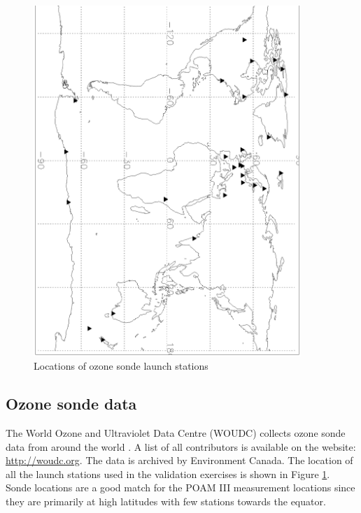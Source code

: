 \begin{figure}
  \begin{flushright}
    \includegraphics[angle=90,width=0.9\textwidth]{ozone_sonde_stations}
    \caption{Locations of ozone sonde launch stations}
    \label{ozone_sonde_stations}
  \end{flushright}
\end{figure}

\subsection{Ozone sonde data}

The World Ozone and Ultraviolet Data Centre (WOUDC) collects ozone sonde data
from around the world \citep{Hare_etal2000}. A list of all contributors is available on the website:
\url{http://woudc.org}.
The data is archived by Environment Canada.
The location of all the launch stations used in the validation exercises is
shown in Figure \ref{ozone_sonde_stations}.
Sonde locations are a good match for the POAM III measurement locations
since they are primarily at high latitudes with few stations
towards the equator.

